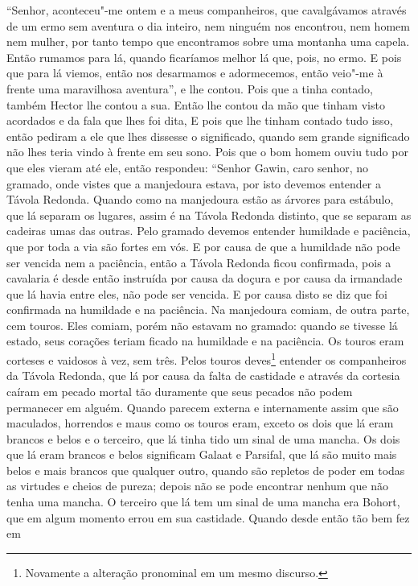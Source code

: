 “Senhor, aconteceu"-me ontem e a meus companheiros, que cavalgávamos através de
um ermo sem aventura o dia inteiro, nem ninguém nos encontrou, nem homem nem
mulher, por tanto tempo que encontramos sobre uma montanha uma capela. Então
rumamos para lá, quando ficaríamos melhor lá que, pois, no ermo. E pois que
para lá viemos, então nos desarmamos e adormecemos, então veio"-me à frente uma
maravilhosa aventura”, e lhe contou. Pois que a tinha contado, também Hector
lhe contou a sua. Então lhe contou da mão que tinham visto acordados e da fala
que lhes foi dita, E pois que lhe tinham contado tudo isso, então pediram a ele
que lhes dissesse o significado, quando sem grande significado não lhes teria
vindo à frente em seu sono. Pois que o bom homem ouviu tudo por que eles vieram
até ele, então respondeu: “Senhor Gawin, caro senhor, no gramado, onde vistes
que a manjedoura estava, por isto devemos entender a Távola Redonda. Quando
como na manjedoura estão as árvores para estábulo, que lá separam os lugares,
assim é na Távola Redonda distinto, que se separam as cadeiras umas das outras.
Pelo gramado devemos entender humildade e paciência, que por toda a via são
fortes em vós. E por causa de que a humildade não pode ser vencida nem a
paciência, então a Távola Redonda ficou confirmada, pois a cavalaria é desde
então instruída por causa da doçura e por causa da irmandade que lá havia entre
eles, não pode ser vencida. E por causa disto se diz que foi confirmada na
humildade e na paciência. Na manjedoura comiam, de outra parte, cem
touros. Eles comiam, porém não estavam no gramado: quando se tivesse lá estado,
seus corações teriam ficado na humildade e na paciência. Os touros eram
corteses e vaidosos à vez, sem três. Pelos touros deves\footnote{ Novamente a
alteração pronominal em um mesmo discurso.}  entender os
companheiros da Távola Redonda, que lá por causa da falta de castidade e
através da cortesia caíram em pecado mortal tão duramente que seus pecados não
podem permanecer em alguém. Quando parecem externa e internamente assim que são
maculados, horrendos e maus como os touros eram, exceto os dois que lá eram
brancos e belos e o terceiro, que lá tinha tido um sinal de uma mancha. Os dois
que lá eram brancos e belos significam Galaat e Parsifal, que lá são muito
mais belos e mais brancos que qualquer outro, quando são repletos de poder em
todas as virtudes e cheios de pureza; depois não se pode encontrar nenhum que
não tenha uma mancha. O terceiro que lá tem um sinal de uma mancha  era Bohort,
que em algum momento errou em sua castidade. Quando desde então tão bem fez em
